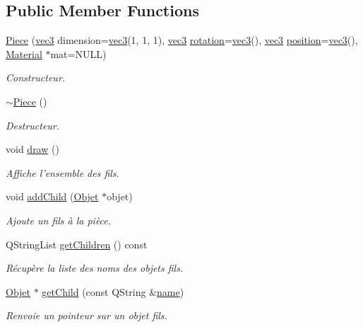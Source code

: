 \subsection*{Public Member Functions}
\begin{DoxyCompactItemize}
\item 
\hyperlink{class_piece_adfc1a07bd6a58ab6cac476fedb38cb15}{Piece} (\hyperlink{structvec3}{vec3} dimension=\hyperlink{structvec3}{vec3}(1, 1, 1), \hyperlink{structvec3}{vec3} \hyperlink{class_objet_ac69a1b459bcb4433099c8cfbff06b209}{rotation}=\hyperlink{structvec3}{vec3}(), \hyperlink{structvec3}{vec3} \hyperlink{class_objet_a0e109bc790b14328202dd2546b04e2fd}{position}=\hyperlink{structvec3}{vec3}(), \hyperlink{class_material}{Material} $\ast$mat=N\+U\+L\+L)
\begin{DoxyCompactList}\small\item\em Constructeur. \end{DoxyCompactList}\item 
\hyperlink{class_piece_a5d7a4f6bade94cb33b6f634de8aa7918}{$\sim$\+Piece} ()
\begin{DoxyCompactList}\small\item\em Destructeur. \end{DoxyCompactList}\item 
void \hyperlink{class_piece_aee937e57fbfe4717aab14e1e892aed2e}{draw} ()
\begin{DoxyCompactList}\small\item\em Affiche l'ensemble des fils. \end{DoxyCompactList}\item 
void \hyperlink{class_piece_af84bf26b989fcd2ab415bdb8b033a627}{add\+Child} (\hyperlink{class_objet}{Objet} $\ast$objet)
\begin{DoxyCompactList}\small\item\em Ajoute un fils à la pièce. \end{DoxyCompactList}\item 
Q\+String\+List \hyperlink{class_piece_a029823aa5135b356a9e4da14578db4e8}{get\+Children} () const 
\begin{DoxyCompactList}\small\item\em Récupère la liste des noms des objets fils. \end{DoxyCompactList}\item 
\hyperlink{class_objet}{Objet} $\ast$ \hyperlink{class_piece_aa77dc9ed8493cc22d1455c3eb2bec013}{get\+Child} (const Q\+String \&\hyperlink{class_objet_a4a702c189bedcbf1e65da6aec72c8e44}{name})
\begin{DoxyCompactList}\small\item\em Renvoie un pointeur sur un objet fils. \end{DoxyCompactList}\item 

\end{DoxyCompactItemize}
